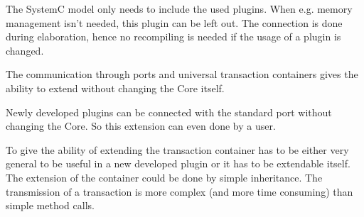 The SystemC model only needs to include the used plugins. When e.g. memory management isn't needed, this plugin can be left out. The connection is done during elaboration, hence no recompiling is needed if the usage of a plugin is changed. 

The communication through ports and universal transaction containers gives the ability to extend \GreenControl without changing the Core itself. 

Newly developed plugins can be connected with the standard port without changing the \GreenControl Core. So this extension can even done by a user. 

To give the ability of extending \GreenControl the transaction
container has to be either very general to be useful in a new
developed plugin or it has to be extendable itself. The extension of
the container could be done by simple inheritance. 
The transmission of a transaction is more complex (and more time consuming) than simple method calls.
